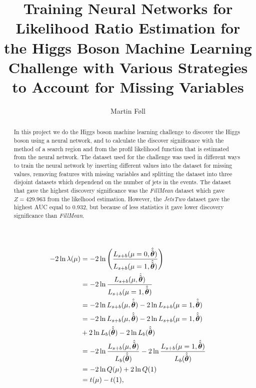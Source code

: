 \documentclass[aps,rmp,reprint,amsmath,amssymb,graphicx,longbibliography]{revtex4-1}
\begin{document}

\title{Training Neural Networks for Likelihood Ratio Estimation for the Higgs Boson Machine Learning Challenge with Various Strategies to Account for Missing Variables}

\author{Martin Føll}


\begin{abstract}
  In this project we do the Higgs boson machine learning challenge \cite{pmlr-v42-cowa14} to discover the Higgs boson using a neural network, and to calculate the discover significance with the method of a search region and from the profil likelihood function that is estimated from the neural network. The dataset used for the challenge was used in different ways to train the neural network by inserting different values into the dataset for missing values, removing features with missing variables and splitting the dataset into three disjoint datasets which dependend on the number of jets in the events. The dataset that gave the highest discovery significance was the \emph{FillMean} dataset which gave \(Z=429.963\) from the likelhood estimation. However, the \emph{JetsTwo} dataset gave the highest AUC equal to 0.932, but because of less statistics it gave lower discovery significance than \emph{FillMean}.
\end{abstract}

\maketitle

\tableofcontents







\appendix
\begin{align}
  -2\ln \lambda(\mu) &= -2\ln\left(\frac{L_{s+b}(\mu=0,\hat{\hat{\bm{\theta}}})}{L_{s+b}(\mu=1,\hat{\hat{\bm{\theta}}})}\right) \notag \\
             &= -2\ln\frac{L_{s+b}(\mu,\hat{\hat{\bm{\theta}}})}{L_{s+b}(\mu=1,\hat{\hat{\bm{\theta}}})} \notag \notag \\
             &= -2\ln L_{s+b}(\mu,\hat{\hat{\bm{\theta}}}) - 2\ln L_{s+b}(\mu=1,\hat{\hat{\bm{\theta}}}) \notag \\              &= -2\ln L_{s+b}(\mu,\hat{\hat{\bm{\theta}}}) - 2\ln L_{s+b}(\mu=1,\hat{\hat{\bm{\theta}}}) \notag \\              &+2\ln L_b(\hat{\hat{\bm{\theta}}}) - 2\ln L_b(\hat{\hat{\bm{\theta}}}) \notag \\
             &= -2\ln \frac{L_{s+b}(\mu,\hat{\hat{\bm{\theta}}})}{L_b(\hat{\hat{\bm{\theta}}})} - 2\ln \frac{L_{s+b}(\mu=1,\hat{\hat{\bm{\theta}}})}{L_b(\hat{\hat{\bm{\theta}}})} \notag \\
             &= -2\ln Q(\mu) + 2\ln Q(1) \notag \\
             &= t(\mu) - t(1),   \label{eq:14}
\end{align}

\cite{moustakides2019training}
\end{document}
